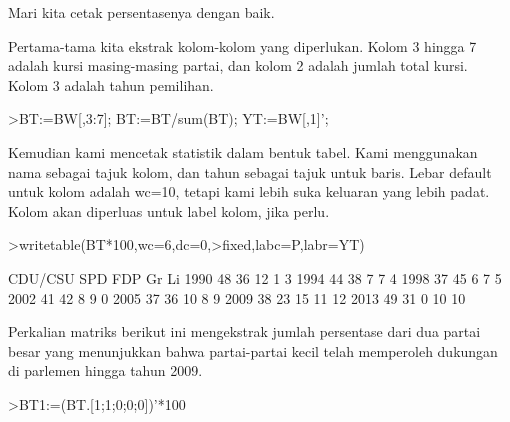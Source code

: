 \documentclass[a4paper,10pt]{article}
\begin{document}
\begin{eulernotebook}
\begin{eulercomment}
\begin{eulercomment}
\begin{eulercomment}
\begin{eulercomment}
\begin{eulercomment}
\begin{eulercomment}
\begin{eulercomment}
\begin{eulercomment}
\begin{eulercomment}
\begin{eulercomment}
\begin{eulercomment}
\begin{eulercomment}
\begin{eulercomment}
\begin{eulercomment}
\begin{eulercomment}
\begin{eulercomment}
\begin{eulercomment}
\begin{eulercomment}
\begin{eulercomment}
\begin{eulercomment}
\begin{eulercomment}
\begin{eulercomment}
\begin{eulercomment}
\begin{eulercomment}
\begin{eulercomment}
\begin{eulercomment}
\begin{eulercomment}
\begin{eulercomment}
\begin{eulercomment}
\begin{eulercomment}
\begin{eulercomment}
\begin{eulercomment}
\begin{eulerprompt}
\end{eulerprompt}
\begin{eulercomment}
Mari kita cetak persentasenya dengan baik.

Pertama-tama kita ekstrak kolom-kolom yang diperlukan. Kolom 3 hingga
7 adalah kursi masing-masing partai, dan kolom 2 adalah jumlah total
kursi. Kolom 3 adalah tahun pemilihan.
\end{eulercomment}
\begin{eulerprompt}
>BT:=BW[,3:7]; BT:=BT/sum(BT); YT:=BW[,1]';
\end{eulerprompt}
\begin{eulercomment}
Kemudian kami mencetak statistik dalam bentuk tabel. Kami menggunakan
nama sebagai tajuk kolom, dan tahun sebagai tajuk untuk baris. Lebar
default untuk kolom adalah wc=10, tetapi kami lebih suka keluaran yang
lebih padat. Kolom akan diperluas untuk label kolom, jika perlu.
\end{eulercomment}
\begin{eulerprompt}
>writetable(BT*100,wc=6,dc=0,>fixed,labc=P,labr=YT)
\end{eulerprompt}
\begin{euleroutput}
         CDU/CSU   SPD   FDP    Gr    Li
    1990      48    36    12     1     3
    1994      44    38     7     7     4
    1998      37    45     6     7     5
    2002      41    42     8     9     0
    2005      37    36    10     8     9
    2009      38    23    15    11    12
    2013      49    31     0    10    10
\end{euleroutput}
\begin{eulercomment}
Perkalian matriks berikut ini mengekstrak jumlah persentase dari dua
partai besar yang menunjukkan bahwa partai-partai kecil telah
memperoleh dukungan di parlemen hingga tahun 2009.
\end{eulercomment}
\begin{eulerprompt}
>BT1:=(BT.[1;1;0;0;0])'*100

\end{eulerprompt}
\end{eulercomment}
\end{eulercomment}
\end{eulercomment}
\end{eulercomment}
\end{eulercomment}
\end{eulercomment}
\end{eulercomment}
\end{eulercomment}
\end{eulercomment}
\end{eulercomment}
\end{eulercomment}
\end{eulercomment}
\end{eulercomment}
\end{eulercomment}
\end{eulercomment}
\end{eulercomment}
\end{eulercomment}
\end{eulercomment}
\end{eulercomment}
\end{eulercomment}
\end{eulercomment}
\end{eulercomment}
\end{eulercomment}
\end{eulercomment}
\end{eulercomment}
\end{eulercomment}
\end{eulercomment}
\end{eulercomment}
\end{eulercomment}
\end{eulercomment}
\end{eulercomment}
\end{eulercomment}
\end{eulernotebook}
\end{document}
